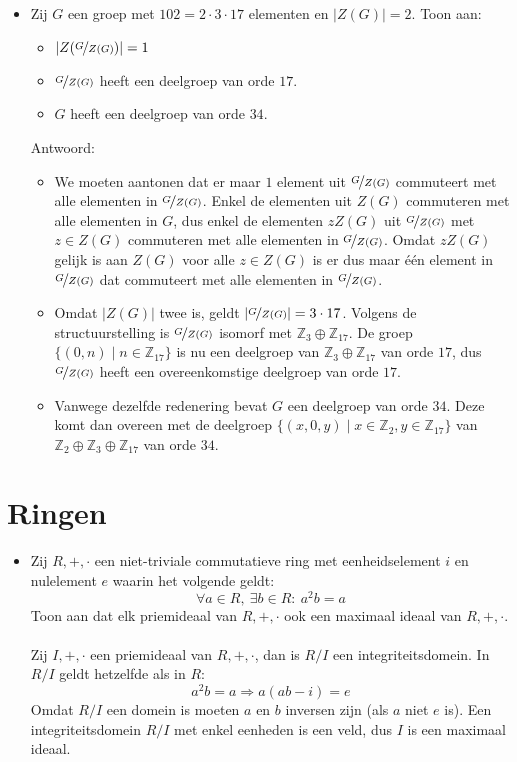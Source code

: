 \documentclass[main.tex]{subfiles}
\begin{document}
\begin{itemize}
 \item 
   Zij $G$ een groep met $102 = 2 \cdot 3 \cdot 17$ elementen en $|Z(G)|=2$. 
   Toon aan:
   \begin{itemize}
   \item $|Z(\nicefrac{G}{Z(G)})| = 1$
   \item $\nicefrac{G}{Z(G)}$ heeft een deelgroep van orde $17$.
   \item $G$ heeft een deelgroep van orde $34$.
   \end{itemize}

   Antwoord:
   \begin{itemize}
   \item
     We moeten aantonen dat er maar $1$ element uit $\nicefrac{G}{Z(G)}$ commuteert met alle elementen in $\nicefrac{G}{Z(G)}$.
     Enkel de elementen uit $Z(G)$ commuteren met alle elementen in $G$, dus enkel de elementen $zZ(G)$ uit $\nicefrac{G}{Z(G)}$ met $z\in Z(G)$ commuteren met alle elementen in $\nicefrac{G}{Z(G)}$.
     Omdat $zZ(G)$ gelijk is aan $Z(G)$ voor alle $z\in Z(G)$ is er dus maar \'e\'en element in $\nicefrac{G}{Z(G)}$ dat commuteert met alle elementen in $\nicefrac{G}{Z(G)}$.
   \item 
     Omdat $|Z(G)|$ twee is, geldt $|\nicefrac{G}{Z(G)}| = 3 \cdot 17$.
     Volgens de structuurstelling is $\nicefrac{G}{Z(G)}$ isomorf met $\mathbb{Z}_{3} \oplus \mathbb{Z}_{17}$. De groep $\{ (0,n) \mid n \in \mathbb{Z}_{17} \}$ is nu een deelgroep van $\mathbb{Z}_{3} \oplus \mathbb{Z}_{17}$ van orde $17$, dus $\nicefrac{G}{Z(G)}$ heeft een overeenkomstige deelgroep van orde $17$.

   \item Vanwege dezelfde redenering bevat $G$ een deelgroep van orde $34$.
     Deze komt dan overeen met de deelgroep $\{ (x,0,y) \mid x\in \mathbb{Z}_{2}, y \in \mathbb{Z}_{17}\}$ van $\mathbb{Z}_{2} \oplus \mathbb{Z}_{3} \oplus \mathbb{Z}_{17}$ van orde $34$.
   \end{itemize}

 \end{itemize}

 \section{Ringen}
 \label{sec:ringen}

 \begin{itemize}
 \item Zij $R,+,\cdot$ een niet-triviale commutatieve ring met eenheidselement $i$ en nulelement $e$ waarin het volgende geldt:
   \[ \forall a\in R,\ \exists b\in R:\ a^{2}b=a \]
   Toon aan dat elk priemideaal van $R,+,\cdot$ ook een maximaal ideaal van $R,+,\cdot$.\\\\
   Zij $I,+,\cdot$ een priemideaal van $R,+,\cdot$, dan is $R/I$ een integriteitsdomein.
   In $R/I$ geldt hetzelfde als in $R$:
   \[ a^{2}b=a \Rightarrow a(ab-i)=e \]
   Omdat $R/I$ een domein is moeten $a$ en $b$ inversen zijn (als $a$ niet $e$ is).
   Een integriteitsdomein $R/I$ met enkel eenheden is een veld, dus $I$ is een maximaal ideaal.
 \end{itemize}
\end{document}
